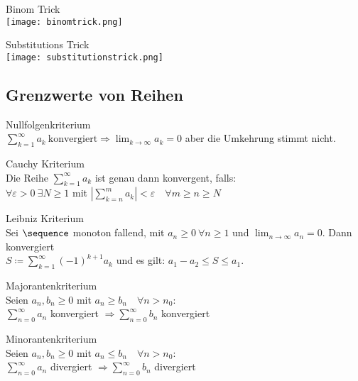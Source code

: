 \begin{KR}{Binom Trick}\\
    \texttt{[image: binomtrick.png]}
\end{KR}

\begin{KR}{Substitutions Trick}\\
    \texttt{[image: substitutionstrick.png]}
\end{KR}

\subsection{Grenzwerte von Reihen}

\begin{concept} {Nullfolgenkriterium}\\
  $\sum_{k=1}^\infty a_k~\text{konvergiert} \Rightarrow \lim_{k \to \infty} a_k = 0$ aber die Umkehrung stimmt nicht.
\end{concept}

\begin{concept} {Cauchy Kriterium}\\
  Die Reihe $\sum_{k=1}^\infty a_k$ ist genau dann konvergent, falls:\\
  $\forall \varepsilon > 0 ~\exists N \geq 1$ mit $\left|\sum_{k=n}^m a_k \right| < \varepsilon \quad \forall m \geq n \geq N$
\end{concept}

\begin{concept} {Leibniz Kriterium}\\
  Sei $\sequence$ monoton fallend, mit $a_n \geq 0~\forall n \geq 1$ und $\lim_{n \to \infty} a_n = 0$. Dann konvergiert\\
  $S \coloneqq \sum_{k = 1}^{\infty} (-1)^{k+1} a_k$
  und es gilt: $a_1 - a_2 \leq S \leq a_1$.
\end{concept}

\begin{concept} {Majorantenkriterium}\\
  Seien $a_n, b_n \geq 0$ mit $a_n \geq b_n \quad \forall n > n_0$:\\
  $\sum_{n=0}^\infty a_n$ konvergiert $\Rightarrow \sum_{n=0}^\infty b_n$ konvergiert 
\end{concept}

\begin{concept} {Minorantenkriterium}\\
  Seien $a_n, b_n \geq 0$ mit $a_n \leq b_n \quad \forall n > n_0$:\\
  $\sum_{n=0}^\infty a_n$ divergiert $\Rightarrow \sum_{n=0}^\infty b_n$ divergiert 
\end{concept}

